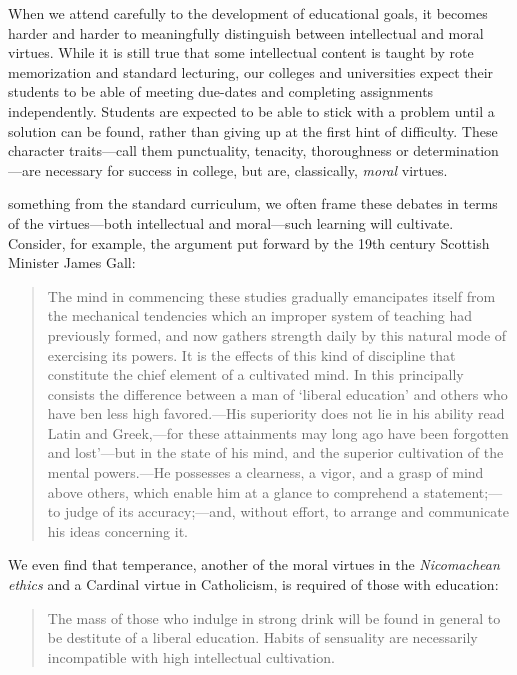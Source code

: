 When we attend carefully to the development of educational goals, it becomes harder and harder to meaningfully distinguish between intellectual and moral virtues. While it is still true that some intellectual content is taught by rote memorization and standard lecturing, our colleges and universities expect their students to be able of meeting due-dates and completing assignments independently. Students are expected to be able to stick with a problem until a solution can be found, rather than giving up at the first hint of difficulty. These character traits---call them punctuality, tenacity, thoroughness or determination---are necessary for success in college, but are, classically, \emph{moral} virtues. 

 something from the standard curriculum, we often frame these debates in terms of the virtues---both intellectual and moral---such learning will cultivate. Consider, for example, the argument put forward by the 19th century Scottish Minister James Gall:

\begin{quote}

The mind in commencing these studies gradually emancipates itself from the mechanical tendencies which an improper system of teaching had previously formed, and now gathers strength daily by this natural mode of exercising its powers. It is the effects of this kind of discipline that constitute the chief element of a cultivated mind. In this principally consists the difference between a man of `liberal education' and others who have ben less high favored.---His superiority does not lie in his ability read Latin and Greek,---for these attainments may long ago have been forgotten and lost'---but in the state of his mind, and the superior cultivation of the mental powers.---He possesses a clearness, a vigor, and a grasp of mind above others, which enable him at a glance to comprehend a statement;---to judge of its accuracy;---and, without effort, to arrange and communicate his ideas concerning it. ~\citep[p. 50]{Gall:1840un}
\end{quote}

We even find that temperance, another of the moral virtues in the \emph{Nicomachean ethics} and a Cardinal virtue in Catholicism, is required of those with education:

\begin{quote}

The mass of those who indulge in strong drink will be found in general to be destitute of a liberal education. Habits of sensuality are necessarily incompatible with high intellectual cultivation. ~\citep[P. 105]{Grindrod:1851tt}
\end{quote}


